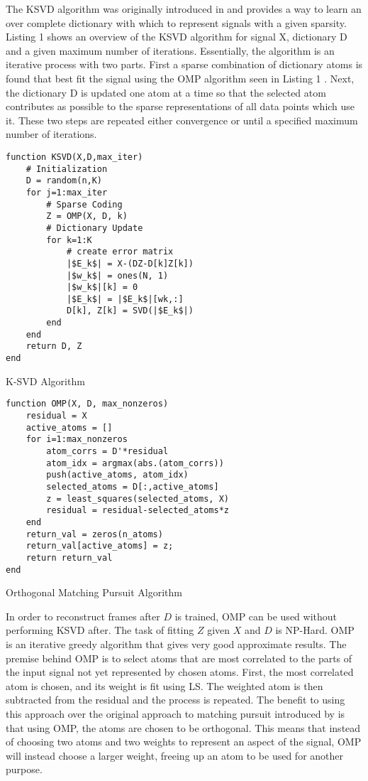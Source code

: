 The \ac{KSVD} algorithm was originally introduced in \cite{aharon_k-svd_2005} and provides a way to learn an over complete dictionary with which to represent signals with a given sparsity. Listing 1 shows an overview of the \ac{KSVD} algorithm for signal X, dictionary D and a given maximum number of iterations. Essentially, the algorithm is an iterative process with two parts. First a sparse combination of dictionary atoms is found that best fit the signal using the \ac{OMP} algorithm seen in Listing 1 \cite{tropp_greed_2004}. Next, the dictionary D is updated one atom at a time so that the selected atom contributes as possible to the sparse representations of all data points which use it. These two steps are repeated either convergence or until a specified maximum number of iterations. \begin{listing}[h]
\begin{verbatim}
function KSVD(X,D,max_iter)
	# Initialization
	D = random(n,K)
	for j=1:max_iter
		# Sparse Coding
		Z = OMP(X, D, k)
		# Dictionary Update
		for k=1:K
			# create error matrix
			|$E_k$| = X-(DZ-D[k]Z[k])
			|$w_k$| = ones(N, 1)
			|$w_k$|[k] = 0
			|$E_k$| = |$E_k$|[wk,:]
			D[k], Z[k] = SVD(|$E_k$|)
		end
	end
	return D, Z
end
\end{verbatim}
\label{lst:ksvd}
\caption{K-SVD Algorithm \cite{aharon_k-svd_2005}}
\end{listing}

\begin{listing}[h]
\begin{verbatim}
function OMP(X, D, max_nonzeros)
	residual = X
	active_atoms = []
	for i=1:max_nonzeros
		atom_corrs = D'*residual
		atom_idx = argmax(abs.(atom_corrs))
		push(active_atoms, atom_idx)
		selected_atoms = D[:,active_atoms]
		z = least_squares(selected_atoms, X)
		residual = residual-selected_atoms*z
	end
	return_val = zeros(n_atoms)
	return_val[active_atoms] = z;
	return return_val
end
\end{verbatim}
\label{lst:omp}
\caption{Orthogonal Matching Pursuit Algorithm \cite{tropp_greed_2004}}
\end{listing}

\noindent
In order to reconstruct frames after $D$ is trained, \ac{OMP} can be used without performing \ac{KSVD} after. The task of fitting $Z$ given $X$ and $D$ is NP-Hard. \ac{OMP} is an iterative greedy algorithm that gives very good approximate results. The premise behind \ac{OMP} is to select atoms that are most correlated to the parts of the input signal not yet represented by chosen atoms. First, the most correlated atom is chosen, and its weight is fit using \ac{LS}. The weighted atom is then subtracted from the residual and the process is repeated. The benefit to using this approach over the original approach to matching pursuit introduced by \cite{mallat_matching_1993-2} is that using  \ac{OMP}, the atoms are chosen to be orthogonal. This means that instead of choosing two atoms and two weights to represent an aspect of the signal, \ac{OMP} will instead choose a larger weight, freeing up an atom to be used for another purpose.


